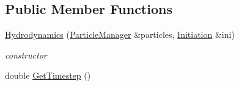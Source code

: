 \subsection*{Public Member Functions}
\begin{CompactItemize}
\item 
\hyperlink{classHydrodynamics_837d2adb43e7d4ea4fa5a1c89bb59313}{Hydrodynamics} (\hyperlink{classParticleManager}{ParticleManager} \&particles, \hyperlink{classInitiation}{Initiation} \&ini)
\begin{CompactList}\small\item\em constructor \item\end{CompactList}\item 
\hypertarget{classHydrodynamics_281acddb6d4dd1efa9970f24a6bf57cd}{
double \hyperlink{classHydrodynamics_281acddb6d4dd1efa9970f24a6bf57cd}{GetTimestep} ()}
\label{classHydrodynamics_281acddb6d4dd1efa9970f24a6bf57cd}


\end{CompactItemize}
